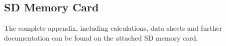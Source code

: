 \subsection*{SD Memory Card}
\label{app SD memory card}
The complete appendix, including calculations, data sheets and further documentation can be found on the attached SD memory card.\\
\noindent
\begin{center}
\end{center}
\newpage

\clearpage
